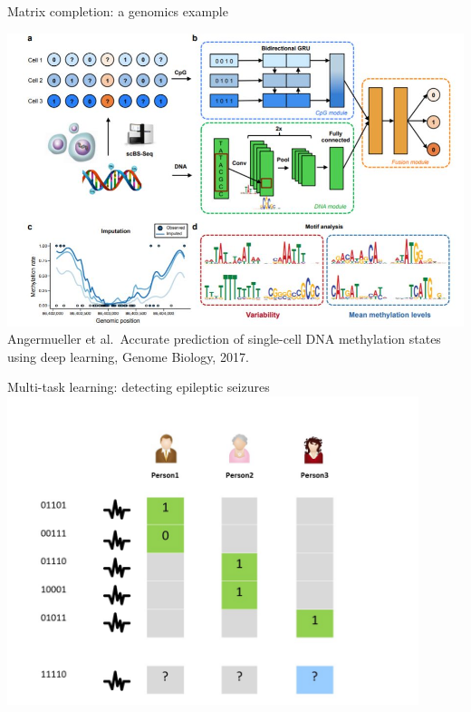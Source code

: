\documentclass[]{beamer}
\begin{document}
\begin{frame}{Matrix completion: a genomics example}

\begin{center}
\includegraphics[scale=0.3]{Figures/deepcpg} \\
Angermueller et al.\ Accurate prediction of single-cell DNA methylation states
using deep learning, Genome Biology, 2017.

\end{center}

\end{frame}

\begin{frame}{Multi-task learning: detecting epileptic seizures}
\includegraphics[width=0.9\textwidth,trim = 0 0 100 50,clip]{Figures/pictures/Slide24}
\end{frame}
\end{document}
